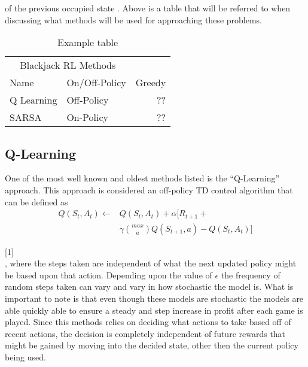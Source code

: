\documentclass[twoside,twocolumn]{article}
\begin{document}
of the previous occupied state \cite{GeeksforGeeks:2021dg}.  Above is a table that will be referred to when discussing what methods will be used for approaching these problems. \\ 

\begin{table}
\caption{Example table}
\centering
\begin{tabular}{llr}
\toprule
\multicolumn{2}{c}{Blackjack RL Methods} \\
\cmidrule(r){1-2}
Name & On/Off-Policy  & Greedy \\
\midrule
Q Learning & Off-Policy & ?? \\
SARSA & On-Policy & ?? \\
\bottomrule
\end{tabular}
\end{table}


\subsection{Q-Learning}

\indent One of the most well known and oldest methods listed is the “Q-Learning” approach.  This approach is considered an off-policy TD control algorithm that can be defined as\\

\begin{align*}
 Q(S_t,A_t) \leftarrow & Q(S_t,A_t)+ \alpha\big[ R_{t+1} +\\
& \gamma \binom{max}{a} Q(S_{t+1}, a) - Q(S_t,A_t)\big]
\end{align*}

[1]\\
, where the steps taken are independent of what the next updated policy might be based upon that action.  Depending upon the value of $\epsilon$ the frequency of random steps taken can vary and vary in how stochastic the model is.  What is important to note is that even though these models are stochastic the models are able quickly able to ensure a steady and step increase in profit after each game is played. Since this methods relies on deciding what actions to take based off of recent actions, the decision is completely independent of future rewards that might be gained by moving into the decided state, other then the current policy being used. 

\end{document}
